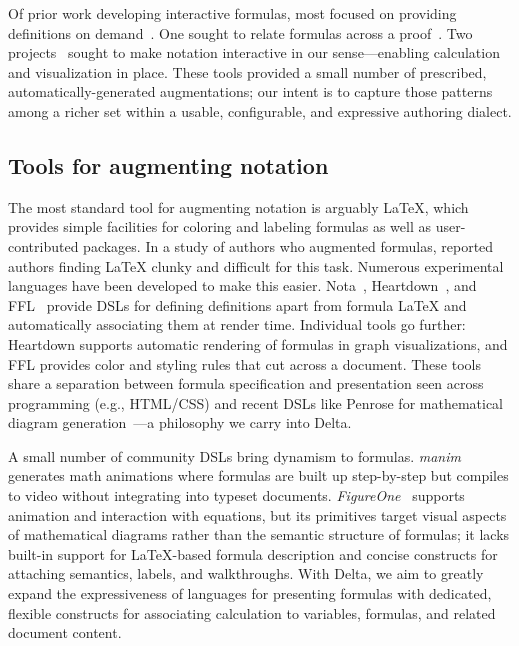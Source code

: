 Of prior work developing interactive formulas, most focused on providing definitions on demand~\cite{Head2020-eg,crichton2021newmedium,ref:li2022heartdown}. One sought to relate formulas across a proof~\cite{ref:alcock2011eproofs}. Two projects~\cite{Chulpongsatorn_2023,Gunturu_2024} sought to make notation interactive in our sense---enabling calculation and visualization in place. These tools provided a small number of prescribed, automatically-generated augmentations; our intent is to capture those patterns among a richer set within a usable, configurable, and expressive authoring dialect.

\subsection{Tools for augmenting notation}

The most standard tool for augmenting notation is arguably LaTeX, which provides simple facilities for coloring \cite{color_package} and labeling formulas\cite{mathtools_package} as well as user-contributed packages\cite{annotate_equations}. In a study of authors who augmented formulas, \citet{Head2022-ws} reported authors finding LaTeX clunky and difficult for this task. Numerous experimental languages have been developed to make this easier. Nota~\cite{crichton2021newmedium}, Heartdown~\cite{ref:li2022heartdown}, and FFL~\cite{Wu2023-xc} provide DSLs for defining definitions apart from formula LaTeX and automatically associating them at render time. Individual tools go further: Heartdown supports automatic rendering of formulas in graph visualizations, and FFL provides color and styling rules that cut across a document. These tools share a separation between formula specification and presentation seen across programming (e.g., HTML/CSS) and recent DSLs like Penrose for mathematical diagram generation~\cite{ref:ye2020penrose}---a philosophy we carry into Delta.

A small number of community DSLs bring dynamism to formulas. \emph{manim}~\cite{manim3b1b} generates math animations where formulas are built up step-by-step but compiles to video without integrating into typeset documents. \emph{FigureOne}~\cite{figureone2018} supports animation and interaction with equations, but its primitives target visual aspects of mathematical diagrams rather than the semantic structure of formulas; it lacks built-in support for LaTeX-based formula description and concise constructs for attaching semantics, labels, and walkthroughs. With Delta, we aim to greatly expand the expressiveness of languages for presenting formulas with dedicated, flexible constructs for associating calculation to variables, formulas, and related document content.

